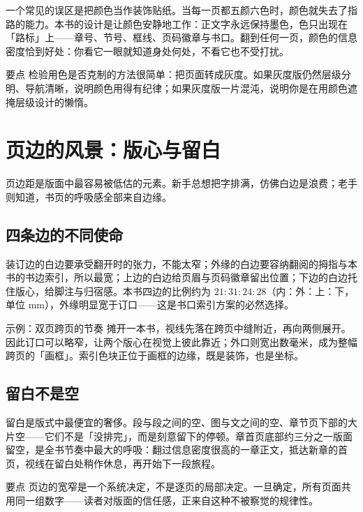 \documentclass{bookedge}
\begin{document}
一个常见的误区是把颜色当作装饰贴纸。当每一页都五颜六色时，颜色就失去了指路的能力。本书的设计是让颜色安静地工作：正文字永远保持墨色，色只出现在「路标」上——章号、节号、框线、页码徽章与书口。翻到任何一页，颜色的信息密度恰到好处：你看它一眼就知道身处何处，不看它也不受打扰。

\begin{notebox}{要点}
检验用色是否克制的方法很简单：把页面转成灰度。如果灰度版仍然层级分明、导航清晰，说明颜色用得有纪律；如果灰度版一片混沌，说明你是在用颜色遮掩层级设计的懒惰。
\end{notebox}

\chapter{页边的风景：版心与留白}

页边距是版面中最容易被低估的元素。新手总想把字排满，仿佛白边是浪费；老手则知道，书页的呼吸感全部来自边缘。

\section{四条边的不同使命}

装订边的白边要承受翻开时的张力，不能太窄；外缘的白边要容纳翻阅的拇指与本书的书边索引，所以最宽；上边的白边给页眉与页码徽章留出位置；下边的白边托住版心，给脚注与归宿感。本书四边的比例约为 $21:31:24:28$（内：外：上：下，单位 mm），外缘明显宽于订口——这是书口索引方案的必然选择。

\begin{examplebox}{示例：双页跨页的节奏}
摊开一本书，视线先落在跨页中缝附近，再向两侧展开。因此订口可以略窄，让两个版心在视觉上彼此靠近；外口则宽出数毫米，成为整幅跨页的「画框」。索引色块正位于画框的边缘，既是装饰，也是坐标。
\end{examplebox}

\section{留白不是空}

留白是版式中最便宜的奢侈。段与段之间的空、图与文之间的空、章节页下部的大片空——它们不是「没排完」，而是刻意留下的停顿。章首页底部约三分之一版面留空，是全书节奏中最大的呼吸：翻过信息密度很高的一章正文，抵达新章的首页，视线在留白处稍作休息，再开始下一段旅程。

\begin{notebox}{要点}
页边的宽窄是一个系统决定，不是逐页的局部决定。一旦确定，所有页面共用同一组数字——读者对版面的信任感，正来自这种不被察觉的规律性。
\end{notebox}
\end{document}
